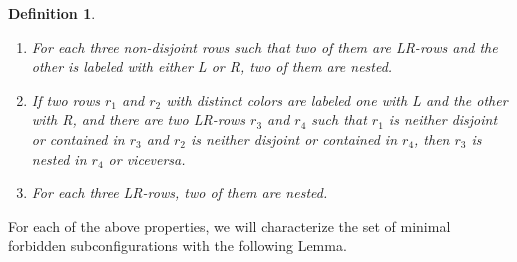 \documentclass[12pt]{book}
\theoremstyle{plain}
\newtheorem{defn}[teo]{Definition}
\theoremstyle{remark}
\begin{document}
\begin{defn}
\begin{enumerate}

		\item For each three non-disjoint rows such that two of them are LR-rows and the other is labeled with either L or R, two of them are nested. \label{item:7_def_adm}

		\item If two rows $r_1$ and $r_2$ with distinct colors are labeled one with L and the other with R, and there are two LR-rows $r_3$ and $r_4$ such that $r_1$ is neither disjoint or contained in $r_3$ and $r_2$ is neither disjoint or contained in $r_4$, then $r_3$ is nested in $r_4$ or viceversa. \label{item:8_def_adm}

		\item For each three LR-rows, two of them are nested. \label{item:9_def_adm}
    \end{enumerate} 	
    
\end{defn}
    
\vspace{2mm}
For each of the above properties, we will characterize the set of minimal forbidden subconfigurations with the following Lemma.
\end{document}
